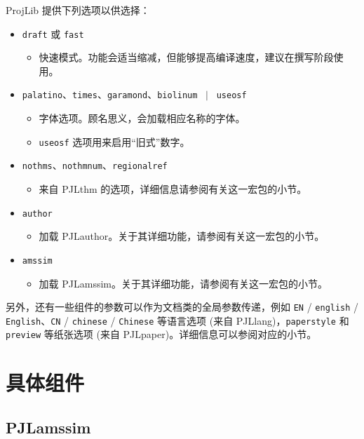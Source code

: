 \documentclass[Chinese,English,French,allowbf,puretext]{lebhart}
\providecommand{\ProjLibPackage}{\textsf{ProjLib}}
\providecommand{\PJLamssim}{\textsf{PJLamssim}}
\providecommand{\PJLauthor}{\textsf{PJLauthor}}
\providecommand{\PJLlang}{\textsf{PJLlang}}
\providecommand{\PJLpaper}{\textsf{PJLpaper}}
\providecommand{\PJLthm}{\textsf{PJLthm}}
\begin{document}
\ProjLibPackage{} 提供下列选项以供选择：
\begin{itemize}
    \item \texttt{draft} 或 \texttt{fast}
        \begin{itemize}
            \item 快速模式。功能会适当缩减，但能够提高编译速度，建议在撰写阶段使用。
        \end{itemize}
    \item \texttt{palatino}、\texttt{times}、\texttt{garamond}、\texttt{biolinum} ~$|$~ \texttt{useosf}
        \begin{itemize}
            \item 字体选项。顾名思义，会加载相应名称的字体。
            \item \texttt{useosf} 选项用来启用“旧式”数字。
        \end{itemize}
    \item \texttt{nothms}、\texttt{nothmnum}、\texttt{regionalref}
        \begin{itemize}
            \item 来自 \PJLthm{} 的选项，详细信息请参阅有关这一宏包的小节。
        \end{itemize}
    \item \texttt{author}
        \begin{itemize}
            \item 加载 \PJLauthor{}。关于其详细功能，请参阅有关这一宏包的小节。
        \end{itemize}
    \item \texttt{amssim}
        \begin{itemize}
            \item 加载 \PJLamssim{}。关于其详细功能，请参阅有关这一宏包的小节。
        \end{itemize}
\end{itemize}
另外，还有一些组件的参数可以作为文档类的全局参数传递，例如 \texttt{EN} / \texttt{english} / \texttt{English}、\texttt{CN} / \texttt{chinese} / \texttt{Chinese} 等语言选项 (来自 \PJLlang{})，\texttt{paperstyle} 和 \texttt{preview} 等纸张选项 (来自 \PJLpaper{})。详细信息可以参阅对应的小节。

\section{具体组件}

\subsection{PJLamssim}
\end{document}

